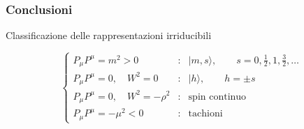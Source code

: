 \documentclass[11pt,t,aspectratio=169]{beamer}
\begin{document}
\begin{frame}[c]
    \frametitle{Conclusioni}
    \Large
    \begin{exampleblock}{Classificazione delle rappresentazioni irriducibili}

        \[
        \left\{
        \begin{array}{lll}

            P_\mu P^\mu=m^2>0
            &:
            &
            |m,s\rangle,
            \qquad
            s=0,\frac12,1,\frac32,\ldots
            \\[0.8em]

            P_\mu P^\mu=0,\quad W^2=0
            &:
            &
            |h\rangle,
            \qquad
            h=\pm s
            \\[0.8em]

            P_\mu P^\mu=0,\quad W^2=-\rho^2
            &:
            &
            \text{spin continuo}
            \\[0.8em]

            P_\mu P^\mu=-\mu^2<0
            &:
            &
            \text{tachioni}

        \end{array}
        \right.
        \]

    \end{exampleblock}

\end{frame}
\end{document}
